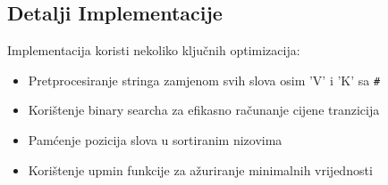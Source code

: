 \subsection{Detalji Implementacije}
Implementacija koristi nekoliko ključnih optimizacija:
\begin{itemize}
    \item Pretprocesiranje stringa zamjenom svih slova osim 'V' i 'K' sa \texttt{\#}
    \item Korištenje binary searcha za efikasno računanje cijene tranzicija
    \item Pamćenje pozicija slova u sortiranim nizovima
    \item Korištenje upmin funkcije za ažuriranje minimalnih vrijednosti
\end{itemize} 